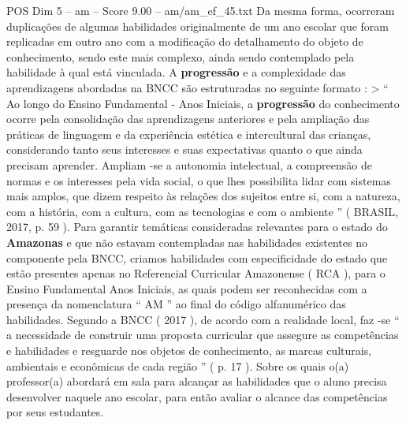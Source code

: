 \begin{textsample}{POS Dim 5 – am – Score 9.00 – am/am\_ef\_45.txt}
Da mesma forma, ocorreram duplicações de algumas habilidades originalmente de um ano escolar que foram replicadas em outro ano com a modificação do detalhamento do objeto de conhecimento, sendo este mais complexo, ainda sendo contemplado pela habilidade à qual está vinculada.
A \textbf{progressão} e a complexidade das aprendizagens abordadas na BNCC são estruturadas no seguinte formato : > “ Ao longo do Ensino Fundamental - Anos Iniciais, a \textbf{progressão} do conhecimento ocorre pela consolidação das aprendizagens anteriores e pela ampliação das práticas de linguagem e da experiência estética e intercultural das crianças, considerando tanto seus interesses e suas expectativas quanto o que ainda precisam aprender.
Ampliam -se a autonomia intelectual, a compreensão de normas e os interesses pela vida social, o que lhes possibilita lidar com sistemas mais amplos, que dizem respeito às relações dos sujeitos entre si, com a natureza, com a história, com a cultura, com as tecnologias e com o ambiente ” ( BRASIL, 2017, p. 59 ).
Para garantir temáticas consideradas relevantes para o estado do \textbf{Amazonas} e que não estavam contempladas nas habilidades existentes no componente pela BNCC, criamos habilidades com especificidade do estado que estão presentes apenas no Referencial Curricular Amazonense ( RCA ), para o Ensino Fundamental Anos Iniciais, as quais podem ser reconhecidas com a presença da nomenclatura “ AM ” ao final do código alfanumérico das habilidades.
Segundo a BNCC ( 2017 ), de acordo com a realidade local, faz -se “ a necessidade de construir uma proposta curricular que assegure as competências e habilidades e resguarde nos objetos de conhecimento, as marcas culturais, ambientais e econômicas de cada região ” ( p. 17 ).
Sobre os quais o(a) professor(a) abordará em sala para alcançar as habilidades que o aluno precisa desenvolver naquele ano escolar, para então avaliar o alcance das competências por seus estudantes.

\end{textsample}
